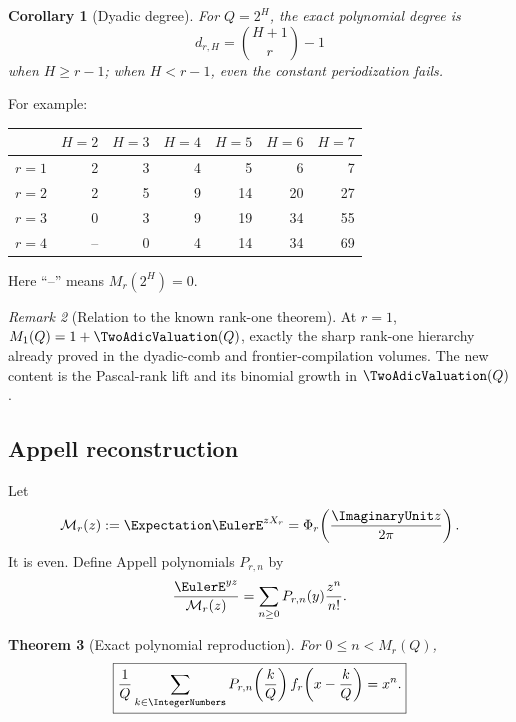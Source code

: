 \documentclass[11pt,oneside]{article}
\newtheorem{theorem}{Theorem}[section]
\newtheorem{corollary}[theorem]{Corollary}
\theoremstyle{definition}
\theoremstyle{remark}
\newtheorem{remark}[theorem]{Remark}
\newcommand{\Mr}{\mathcal M}
\begin{document}
\begin{corollary}[Dyadic degree]\label{cor:dyadic-degree}
For $Q=2^H$, the exact polynomial degree is
\begin{equation}\label{eq:dyadic-degree}
 d_{r,H}=\binom{H+1}{r}-1
\end{equation}
when $H\geq r-1$; when $H<r-1$, even the constant periodization fails.
\end{corollary}

For example:
\begin{center}
\begin{tabular}{@{}c|rrrrrr@{}}
\toprule
& $H=2$ & $H=3$ & $H=4$ & $H=5$ & $H=6$ & $H=7$\\
\midrule
$r=1$ & 2 & 3 & 4 & 5 & 6 & 7\\
$r=2$ & 2 & 5 & 9 & 14 & 20 & 27\\
$r=3$ & 0 & 3 & 9 & 19 & 34 & 55\\
$r=4$ & -- & 0 & 4 & 14 & 34 & 69\\
\bottomrule
\end{tabular}
\end{center}
Here ``--'' means $M_r(2^H)=0$.

\begin{remark}[Relation to the known rank-one theorem]
At $r=1$, $M_1(Q)=1+\TwoAdicValuation(Q)$, exactly the sharp rank-one hierarchy already
proved in the dyadic-comb and frontier-compilation volumes.  The new content is
the Pascal-rank lift and its binomial growth in $\TwoAdicValuation(Q)$.
\end{remark}

\subsection{Appell reconstruction}

Let
\begin{equation}\label{eq:mgf}
 \Mr_r(z):=\Expectation\EulerE^{zX_r}=\Phi_r\!\left(\frac{\ImaginaryUnit z}{2\pi}\right).
\end{equation}
It is even.  Define Appell polynomials $P_{r,n}$ by
\begin{equation}\label{eq:Appell}
 \frac{\EulerE^{yz}}{\Mr_r(z)}
 =\sum_{n\geq0}P_{r,n}(y)\frac{z^n}{n!}.
\end{equation}

\begin{theorem}[Exact polynomial reproduction]\label{thm:Appell-reproduction}
For $0\leq n<M_r(Q)$,
\begin{equation}\label{eq:Appell-reproduce}
 \boxed{
 \frac1Q\sum_{k\in\IntegerNumbers}P_{r,n}\!\left(\frac{k}{Q}\right)
 f_r\!\left(x-\frac{k}{Q}\right)=x^n.}
\end{equation}
\end{theorem}
\end{document}

